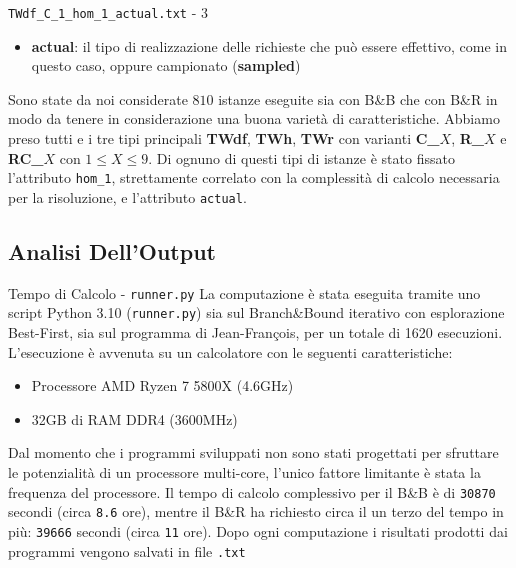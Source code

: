 \documentclass[10pt]{beamer}
\begin{document}
    \begin{frame}{\texttt{TWdf\_C\_1\_hom\_1\_actual.txt} - 3}
        \begin{itemize}
            \item \textbf{actual}: il tipo di realizzazione delle richieste che può essere effettivo, come in questo caso, oppure campionato (\textbf{sampled}) 
        \end{itemize}
        Sono state da noi considerate $810$ istanze eseguite sia con B\&B che con B\&R in modo da tenere in considerazione una buona varietà di caratteristiche. Abbiamo preso tutti e i tre tipi principali \textbf{TWdf}, \textbf{TWh}, \textbf{TWr} con varianti \textbf{C\_}$X$, \textbf{R\_}$X$ e \textbf{RC\_}$X$ con $1 \leq X \leq 9$. Di ognuno di questi tipi di istanze è stato fissato l'attributo \texttt{hom\_1}, strettamente correlato con la complessità di calcolo necessaria per la risoluzione, e l'attributo \texttt{actual}.
    \end{frame}

    \subsection{Analisi Dell'Output}
    \begin{frame}{Tempo di Calcolo - \texttt{runner.py}}
        La computazione è stata eseguita tramite uno script Python 3.10 (\texttt{runner.py}) sia sul Branch\&Bound iterativo con esplorazione Best-First, sia sul programma di Jean-François, per un totale di 1620 esecuzioni. L'esecuzione è avvenuta su un calcolatore con le seguenti caratteristiche:
        \begin{itemize}
            \item Processore AMD Ryzen 7 5800X (4.6GHz)
            \item 32GB di RAM DDR4 (3600MHz)
        \end{itemize}
        Dal momento che i programmi sviluppati non sono stati progettati per sfruttare le potenzialità di un processore multi-core, l'unico fattore limitante è stata la frequenza del processore. Il tempo di calcolo complessivo per il B\&B è di \texttt{30870} secondi (circa \texttt{8.6} ore), mentre il B\&R ha richiesto circa il un terzo del tempo in più: \texttt{39666} secondi (circa \texttt{11} ore). Dopo ogni computazione i risultati prodotti dai programmi vengono salvati in file \texttt{.txt}
    \end{frame}
\end{document}
